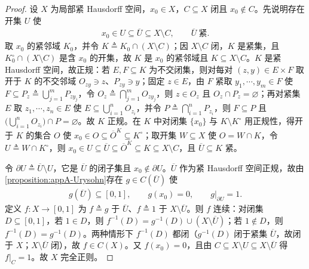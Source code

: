 \documentclass[../main.tex]{subfiles}
\begin{document}
\begin{proof}
设 $X$ 为局部紧 Hausdorff 空间，$x_0\in X$，$C\subseteq X$ 闭且 $x_0\notin C$。先说明存在开集 $U$ 使
\begin{align*}
x_0\in U\subseteq\overline{U}\subseteq X\setminus C,\qquad \overline{U}\ \text{紧}.
\end{align*}
取 $x_0$ 的紧邻域 $K_0$，并令 $K\triangleq K_0\cap(X\setminus C)$；因 $X\setminus C$ 闭，$K$ 是紧集，且 $K_0^\circ\cap(X\setminus C)$ 是含 $x_0$ 的开集，故 $K$ 是 $x_0$ 的紧邻域且 $K\subseteq X\setminus C$。$K$ 是紧 Hausdorff 空间，故正规：若 $E,F\subseteq K$ 为不交闭集，则对每对 $(z,y)\in E\times F$ 取开于 $K$ 的不交邻域 $O_{zy}\ni z$、$P_{zy}\ni y$；固定 $z\in E$，由 $F$ 紧取 $y_1,\cdots ,y_m\in F$ 使 $F\subseteq P_z\triangleq\bigcup_{j=1}^mP_{zy_j}$，令 $O_z\triangleq\bigcap_{j=1}^mO_{zy_j}$，则 $z\in O_z$ 且 $O_z\cap P_z=\varnothing$；再对紧集 $E$ 取 $z_1,\cdots ,z_n\in E$ 使 $E\subseteq\bigcup_{i=1}^nO_{z_i}$，并令 $P\triangleq\bigcap_{i=1}^nP_{z_i}$，则 $F\subseteq P$ 且 $\bigl(\bigcup_{i=1}^nO_{z_i}\bigr)\cap P=\varnothing$。故 $K$ 正规。在 $K$ 中对闭集 $\{x_0\}$ 与 $K\setminus K^\circ$ 用正规性，得开于 $K$ 的集合 $O$ 使 $x_0\in O\subseteq\overline{O}^K\subseteq K^\circ$；取开集 $W\subseteq X$ 使 $O=W\cap K$，令 $U\triangleq W\cap K^\circ$，则 $x_0\in U\subseteq\overline{U}\subseteq\overline{O}^K\subseteq K\subseteq X\setminus C$，且 $\overline{U}\subseteq K$ 紧。

令 $\partial U\triangleq\overline{U}\setminus U$，它是 $\overline U$ 的闭子集且 $x_0\notin\partial U$。$\overline U$ 作为紧 Hausdorff 空间正规，故由\cref{proposition:appA-Urysohn}存在 $g\in C(\overline U)$ 使
\begin{align*}
g(\overline U)\subseteq[0,1],\qquad g(x_0)=0,\qquad g|_{\partial U}=1.
\end{align*}
定义 $f:X\to[0,1]$ 为 $f\triangleq g$ 于 $\overline U$、$f\triangleq1$ 于 $X\setminus\overline U$。则 $f$ 连续：对闭集 $D\subseteq[0,1]$，若 $1\in D$，则 $f^{-1}(D)=g^{-1}(D)\cup(X\setminus\overline U)$；若 $1\notin D$，则 $f^{-1}(D)=g^{-1}(D)$。两种情形下 $f^{-1}(D)$ 都闭（$g^{-1}(D)$ 闭于紧集 $\overline U$，故闭于 $X$；$X\setminus\overline U$ 闭），故 $f\in C(X)$。又 $f(x_0)=0$，且由 $C\subseteq X\setminus U\subseteq X\setminus\overline U$ 得 $f|_C=1$。故 $X$ 完全正则。
\end{proof}
\end{document}

